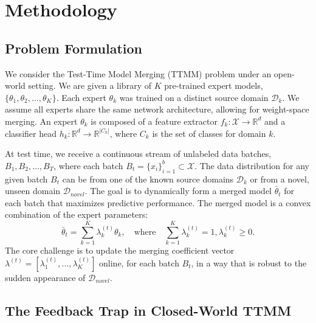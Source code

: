 \documentclass[twoside]{article}
\begin{document}
\section{Methodology}
\label{sec:methodology}

\subsection{Problem Formulation}

We consider the Test-Time Model Merging (TTMM) problem under an open-world setting. We are given a library of $K$ pre-trained expert models, $\{\theta_1, \theta_2, \dots, \theta_K\}$. Each expert $\theta_k$ was trained on a distinct source domain $\mathcal{D}_k$. We assume all experts share the same network architecture, allowing for weight-space merging. An expert $\theta_k$ is composed of a feature extractor $f_k: \mathcal{X} \to \mathbb{R}^d$ and a classifier head $h_k: \mathbb{R}^d \to \mathbb{R}^{|C_k|}$, where $C_k$ is the set of classes for domain $k$.

At test time, we receive a continuous stream of unlabeled data batches, $B_1, B_2, \dots, B_T$, where each batch $B_t = \{x_i\}_{i=1}^b \subset \mathcal{X}$. The data distribution for any given batch $B_t$ can be from one of the known source domains $\mathcal{D}_k$ or from a novel, unseen domain $\mathcal{D}_{novel}$. The goal is to dynamically form a merged model $\bar{\theta}_t$ for each batch that maximizes predictive performance. The merged model is a convex combination of the expert parameters:
\begin{equation}
\bar{\theta}_t = \sum_{k=1}^K \lambda_k^{(t)} \theta_k, \quad \text{where} \quad \sum_{k=1}^K \lambda_k^{(t)} = 1, \lambda_k^{(t)} \ge 0.
\label{eq:merge}
\end{equation}
The core challenge is to update the merging coefficient vector $\lambda^{(t)} = [\lambda_1^{(t)}, \dots, \lambda_K^{(t)}]$ online, for each batch $B_t$, in a way that is robust to the sudden appearance of $\mathcal{D}_{novel}$.

\subsection{The Feedback Trap in Closed-World TTMM}
\label{sec:feedback_trap}
\end{document}
